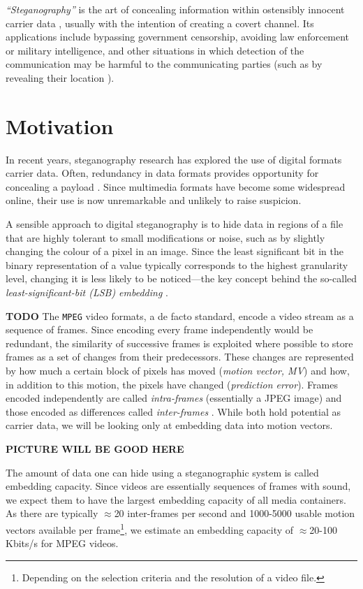 \documentclass[12pt,british,twoside,notitlepage,usenames,dvipsnames,hypens,final]{report}
\numberwithin{equation}{section}
\numberwithin{figure}{section}
\begin{document}
\emph{``Steganography''} is the art of concealing information within ostensibly innocent carrier data \cite[p. 3]{fridrich}, usually with the intention of creating a covert channel. Its applications include bypassing government censorship, avoiding law enforcement or military intelligence, and other situations in which detection of the communication may be harmful to the communicating parties (such as by revealing their location \cite{infohiding-survey}). 
 
\section{Motivation}

In recent years, steganography research has explored the use of digital formats carrier data. Often, redundancy in data formats provides opportunity for concealing a payload \cite[p. 2]{fridrich}. Since multimedia formats have become some widespread online, their use is now unremarkable and unlikely to raise suspicion.

A sensible approach to digital steganography is to hide data in regions of a file that are highly tolerant to small modifications or noise, such as by slightly changing the colour of a pixel in an image. Since the least significant bit in the binary representation of a value typically corresponds to the highest granularity level, changing it is less likely to be noticed---the key concept behind the so-called \emph{least-significant-bit (LSB) embedding} \cite{bateman}.

\textbf{TODO} The \texttt{MPEG} video formats, a de facto standard, encode a video stream as a sequence of frames. Since encoding every frame independently would be redundant, the similarity of successive frames is exploited where possible to store frames as a set of changes from their predecessors. These changes are represented by how much a certain block of pixels has moved (\emph{motion vector, MV}) and how, in addition to this motion, the pixels have changed (\emph{prediction error}). Frames encoded independently are called \emph{intra-frames} \cite{h264-std} (essentially a JPEG image) and those encoded as differences called \emph{inter-frames} \cite{h264-std}. While both hold potential as carrier data, we will be looking only at embedding data into motion vectors.

\textbf{PICTURE WILL BE GOOD HERE}

The amount of data one can hide using a steganographic system is called embedding capacity. Since videos are essentially sequences of frames with sound, we expect them to have the largest embedding capacity of all media containers. As there are typically $\approx$20 inter-frames per second and 1000-5000 usable motion vectors available per frame\footnote{Depending on the selection criteria and the resolution of a video file.}, we estimate an embedding capacity of $\approx$20-100 Kbits/s for MPEG videos.
\end{document}
